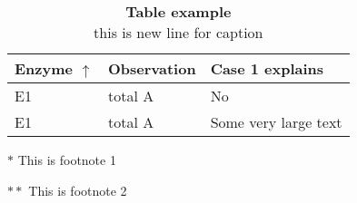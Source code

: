 \documentclass{article}
\begin{document}
	
	
	\begin{table}
		\centering %
		\begin{threeparttable}
		\captionsetup{justification=centering,margin=2cm} %
		\caption{\textbf{Table example } \\ this is new line for caption\label{other_data}}
		
		\begin{tabular}{| >{\centering\arraybackslash}m{3cm} | >{\centering\arraybackslash}m{3cm} | >{\centering\arraybackslash}m{4cm} |}
			\hline
			\textbf {Enzyme} $\uparrow$ & \textbf{Observation} & \textbf {Case 1 explains}\parbox{0pt}{\rule{0pt}{2ex+\baselineskip}}\\ \hline 
			E1  & total A & No \\[0ex] \hline
			E1  & total A & Some very large text \parbox{0pt}{\rule{0pt}{2ex+\baselineskip}}\\\hline
			\end{tabular}
			\begin{tablenotes}
				\item[$\ast$] {\footnotesize This is footnote 1}
				\item[$\ast\ast$] {\footnotesize This is footnote 2}
			\end{tablenotes}
			
		\end{threeparttable}
		
	\end{table} 
	
	
\end{document}

